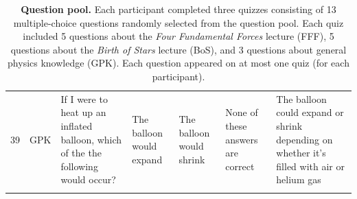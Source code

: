 \documentclass[10pt]{article}
\begin{document}
\begin{tiny}
\begin{longtable}{r|p{0.375in}|p{1.275in}|p{0.75in}|p{0.75in}|p{0.75in}|p{0.75in}}
    39    &      GPK &                                                                                                                                                                                                If I were to heat up an inflated balloon, which of the the following would occur? &                                                                                                              The balloon would expand &                                                                              The balloon would shrink &                                                                                          None of these answers are correct &                                        The balloon could expand or shrink depending on whether it's filled with air or helium gas \\

    \caption{\textbf{Question pool.} Each participant completed three quizzes consisting 
    of 13 multiple-choice questions randomly selected from the question pool. Each 
    quiz included 5 questions about the \textit{Four Fundamental Forces} lecture 
    (FFF), 5 questions about the \textit{Birth of Stars} lecture (BoS), and 3 questions 
    about general physics knowledge (GPK). Each question appeared on at most 
    one quiz (for each participant).}

    \label{tab:questions}
    \end{longtable}
\end{tiny}
\end{document}
